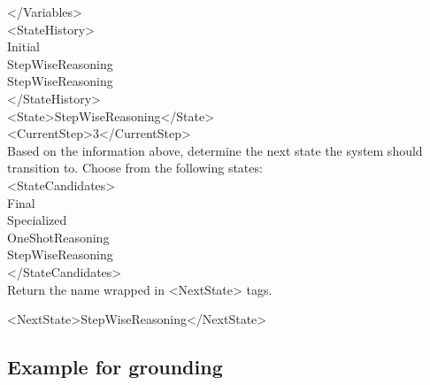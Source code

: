 \documentclass{article} %
\newcommand{\revise}[1]{{#1}}
\newcommand{\methodname}{MATA}
\newcommand{\datasetname}{\methodname-SFT-90K}
\begin{document}
\begin{prompt}[title={Example \thetcbcounter: \datasetname{} Example Input}]
</Variables>\\
<StateHistory>\\
Initial\\
StepWiseReasoning\\
StepWiseReasoning\\
</StateHistory>\\
<State>StepWiseReasoning</State>\\
<CurrentStep>3</CurrentStep>\\
Based on the information above, determine the next state the system should transition to. Choose from the following states:\\
<StateCandidates>\\
Final\\
Specialized\\
OneShotReasoning\\
StepWiseReasoning\\
</StateCandidates>\\
Return the name wrapped in <NextState> tags.
\end{prompt}

\begin{prompt}[title={Example \thetcbcounter: \datasetname{} Example Output}]
<NextState>StepWiseReasoning</NextState>
\end{prompt}

\subsection{\revise{Example for grounding}}
\end{document}
